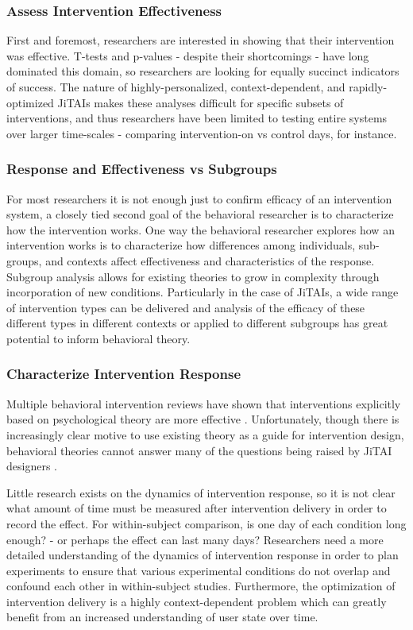 \subsubsection{Assess Intervention Effectiveness}
First and foremost, researchers are interested in showing that their intervention was effective.
T-tests and p-values - despite their shortcomings \cite{nuzzo2014} - have long dominated this domain, so researchers are looking for equally succinct indicators of success.
The nature of highly-personalized, context-dependent, and rapidly-optimized JiTAIs makes these analyses difficult for specific subsets of interventions, and thus researchers have been limited to testing entire systems over larger time-scales - comparing intervention-on vs control days, for instance.

\subsubsection{Response and Effectiveness vs Subgroups}
For most researchers it is not enough just to confirm efficacy of an intervention system, a closely tied second goal of the behavioral researcher is to characterize how the intervention works.
One way the behavioral researcher explores how an intervention works is to characterize how differences among individuals, sub-groups, and contexts affect effectiveness and characteristics of the response.
Subgroup analysis allows for existing theories to grow in complexity through incorporation of new conditions.
Particularly in the case of JiTAIs, a wide range of intervention types can be delivered and analysis of the efficacy of these different types in different contexts or applied to different subgroups has great potential to inform behavioral theory.


\subsubsection{Characterize Intervention Response}
Multiple behavioral intervention reviews have shown that interventions explicitly based on psychological theory are more effective \cite{glanz2010}.
Unfortunately, though there is increasingly clear motive to use existing theory as a guide for intervention design, behavioral theories cannot answer many of the questions being raised by JiTAI designers \cite{riley2011}.

Little research exists on the dynamics of intervention response, so it is not clear what amount of time must be measured after intervention delivery in order to record the effect.
For within-subject comparison, is one day of each condition long enough? - or perhaps the effect can last many days?
Researchers need a more detailed understanding of the dynamics of intervention response in order to plan experiments to ensure that various experimental conditions do not overlap and confound each other in within-subject studies.
Furthermore, the optimization of intervention delivery is a highly context-dependent problem which can greatly benefit from an increased understanding of user state over time.

